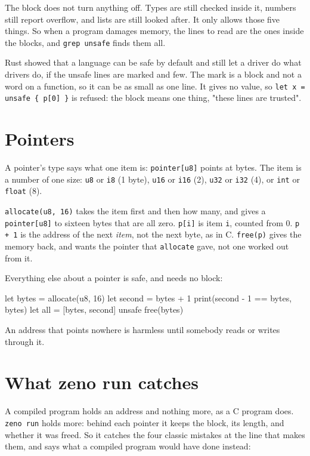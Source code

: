 The block does not turn anything off. Types are still checked inside
it, numbers still report overflow, and lists are still looked after. It
only allows those five things. So when a program damages memory, the
lines to read are the ones inside the blocks, and \verb|grep unsafe|
finds them all.

\begin{why}
Rust showed that a language can be safe by default and still let a
driver do what drivers do, if the unsafe lines are marked and few. The
mark is a block and not a word on a function, so it can be as small as
one line. It gives no value, so \verb|let x = unsafe { p[0] }| is
refused: the block means one thing, "these lines are trusted".
\end{why}

\section{Pointers}

A pointer's type says what one item is: \verb|pointer[u8]| points at
bytes. The item is a number of one size: \verb|u8| or \verb|i8| (1
byte), \verb|u16| or \verb|i16| (2), \verb|u32| or \verb|i32| (4), or
\verb|int| or \verb|float| (8).

\verb|allocate(u8, 16)| takes the item first and then how many, and
gives a \verb|pointer[u8]| to sixteen bytes that are all zero.
\verb|p[i]| is item \verb|i|, counted from 0. \verb|p + 1| is the
address of the next \emph{item}, not the next byte, as in C.
\verb|free(p)| gives the memory back, and wants the pointer that
\verb|allocate| gave, not one worked out from it.

Everything else about a pointer is safe, and needs no block:

\begin{zeno}
let bytes = allocate(u8, 16)
let second = bytes + 1
print(second - 1 == bytes, bytes)
let all = [bytes, second]
unsafe {
    free(bytes)
}
\end{zeno}

An address that points nowhere is harmless until somebody reads or
writes through it.

\section{What zeno run catches}

A compiled program holds an address and nothing more, as a C program
does. \verb|zeno run| holds more: behind each pointer it keeps the
block, its length, and whether it was freed. So it catches the four
classic mistakes at the line that makes them, and says what a compiled
program would have done instead:

